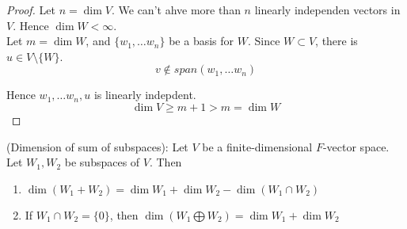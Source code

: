 \begin{proof}
Let $n = \dim V$. We can't ahve more than $n$ linearly independen vectors in $V$. Hence $\dim W < \infty$. \\

Let $m = \dim W$, and $\{ w_1, \hdots w_n \} $ be a basis for $W$. Since $W \subset V$, there is $u \in V \setminus \{ W \} $. 
\[
  v \notin span(w_1, \hdots w_n)
\]

Hence $w_1, \dots w_n, u$ is linearly indepdent. 
\[
   \dim V \geq m+ 1 > m = \dim W
\]
\end{proof}

\begin{theorem}
(Dimension of sum of subspaces): Let $V$ be a finite-dimensional $F$-vector space. Let $W_1, W_2$ be subspaces of $V$. Then 
    \begin{enumerate}
        \item $\dim (W_1 + W_2) = \dim W_1 + \dim W_2 - \dim (W_1 \cap W_2)$
        \item If $W_1 \cap W_2 = \{ 0 \} $, then $\dim (W_1 \bigoplus W_2) = \dim W_1 + \dim W_2$
    \end{enumerate}
\end{theorem} 

